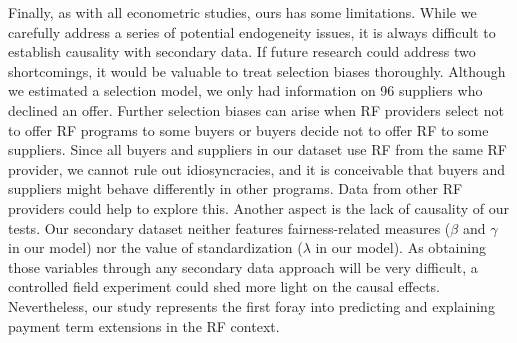 \documentclass[a4paper,11pt]{article}
\renewcommand{\~}[1]{\tilde{#1}}
\renewcommand{\-}[1]{\overline{#1}}
\def\bibsep{\smallskipamount}%
\begin{document}
Finally, as with all econometric studies, ours has some limitations. While we carefully address a series of potential endogeneity issues, it is always difficult to establish causality with secondary data. If future research could address two shortcomings, it would be valuable to treat selection biases thoroughly. Although we estimated a selection model, we only had information on 96 suppliers who declined an offer. Further selection biases can arise when RF providers select not to offer RF programs to some buyers or buyers decide not to offer RF to some suppliers. Since all buyers and suppliers in our dataset use RF from the same RF provider, we cannot rule out idiosyncracies, and it is conceivable that buyers and suppliers might behave differently in other programs. Data from other RF providers could help to explore this. Another aspect is the lack of causality of our tests. Our secondary dataset neither features fairness-related measures ($\beta$ and $\gamma$ in our model) nor the value of standardization ($\lambda$ in our model). As obtaining those variables through any secondary data approach will be very difficult, a controlled field experiment could shed more light on the causal effects. Nevertheless, our study represents the first foray into predicting and explaining payment term extensions in the RF context. 


\def\enoteformat{\rightskip=0pt \leftskip=0pt \parindent=0em
  \leavevmode\llap{\makeenmark}}


\singlespacing
\begin{flushleft}
\setlength{\bibsep}{0pt plus 0.3ex}
\footnotesize
\theendnotes
\end{flushleft}
\end{document}
